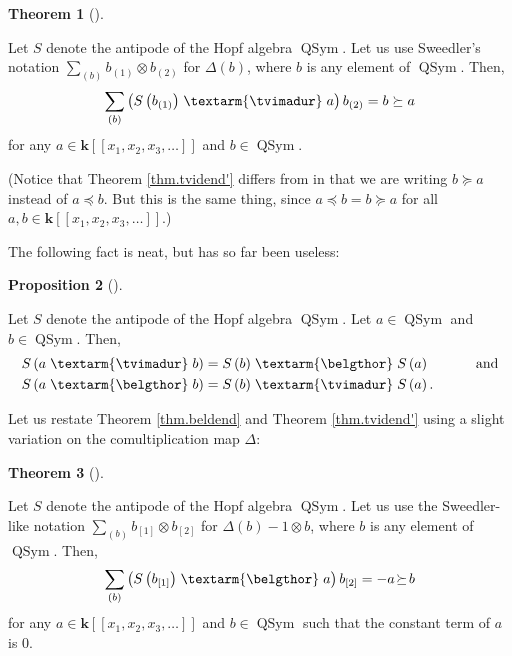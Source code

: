 \documentclass[numbers=enddot,12pt,final,onecolumn,notitlepage]{scrartcl}%
\theoremstyle{definition}
\newtheorem{theo}{Theorem}[section]
\newenvironment{theorem}[1][]
{\begin{theo}[#1]\begin{leftbar}}
{\end{leftbar}\end{theo}}
\newtheorem{prop}[theo]{Proposition}
\newenvironment{proposition}[1][]
{\begin{prop}[#1]\begin{leftbar}}
{\end{leftbar}\end{prop}}
\newenvironment{verlong}{}{}
\newenvironment{noncompile}{}{}
\newcommand{\tvi}{\left. \textarm{\tvimadur} \right.}
\newcommand{\bel}{\left. \textarm{\belgthor} \right.}
\let\sumnonlimits\sum
\renewcommand{\sum}{\sumnonlimits\limits}
\begin{document}
\begin{verlong}
\begin{theorem}
\label{thm.tvidend'}Let $S$ denote the antipode of the Hopf algebra
$\operatorname*{QSym}$. Let us use Sweedler's notation $\sum_{\left(
b\right)  }b_{\left(  1\right)  }\otimes b_{\left(  2\right)  }$ for
$\Delta\left(  b\right)  $, where $b$ is any element of $\operatorname*{QSym}%
$. Then,%
\[
\sum_{\left(  b\right)  }\left(  S\left(  b_{\left(  1\right)  }\right)
\tvi  a\right)  b_{\left(  2\right)  }=b\left.  \succeq\right.  a
\]
for any $a\in\mathbf{k}\left[  \left[  x_{1},x_{2},x_{3},\ldots\right]
\right]  $ and $b\in\operatorname*{QSym}$.
\end{theorem}

(Notice that Theorem \ref{thm.tvidend'} differs from \cite[detailed version,
Theorem 3.15]{dimcr} in that we are writing $b\left.  \succeq\right.  a$
instead of $a\left.  \preceq\right.  b$. But this is the same thing, since
$a\left.  \preceq\right.  b=b\left.  \succeq\right.  a$ for all $a,b\in
\mathbf{k}\left[  \left[  x_{1},x_{2},x_{3},\ldots\right]  \right]  $.)

\begin{noncompile}
The following fact is neat, but has so far been useless:

\begin{proposition}
\label{prop.tvibel.antipode}Let $S$ denote the antipode of the Hopf algebra
$\operatorname*{QSym}$. Let $a\in\operatorname*{QSym}$ and $b\in
\operatorname*{QSym}$. Then,%
\begin{align*}
S\left(  a\tvi b\right)   &  =S\left(  b\right)  \bel S\left(  a\right)
\ \ \ \ \ \ \ \ \ \ \text{and}\\
S\left(  a\bel b\right)   &  =S\left(  b\right)  \tvi S\left(  a\right)  .
\end{align*}

\end{proposition}
\end{noncompile}

\begin{noncompile}
Let us restate Theorem \ref{thm.beldend} and Theorem \ref{thm.tvidend'} using
a slight variation on the comultiplication map $\Delta$:

\begin{theorem}
\label{thm.beldend.Del'}Let $S$ denote the antipode of the Hopf algebra
$\operatorname*{QSym}$. Let us use the Sweedler-like notation $\sum_{\left(
b\right)  }b_{\left[  1\right]  }\otimes b_{\left[  2\right]  }$ for
$\Delta\left(  b\right)  -1\otimes b$, where $b$ is any element of
$\operatorname*{QSym}$. Then,%
\[
\sum_{\left(  b\right)  }\left(  S\left(  b_{\left[  1\right]  }\right)
\bel
a\right)  b_{\left[  2\right]  }=-a\mathfrak{\left.  \succeq\right.  }b
\]
for any $a\in\mathbf{k}\left[  \left[  x_{1},x_{2},x_{3},\ldots\right]
\right]  $ and $b\in\operatorname*{QSym}$ such that the constant term
of $a$ is $0$.
\end{theorem}


\end{noncompile}
\end{verlong}
\end{document}
